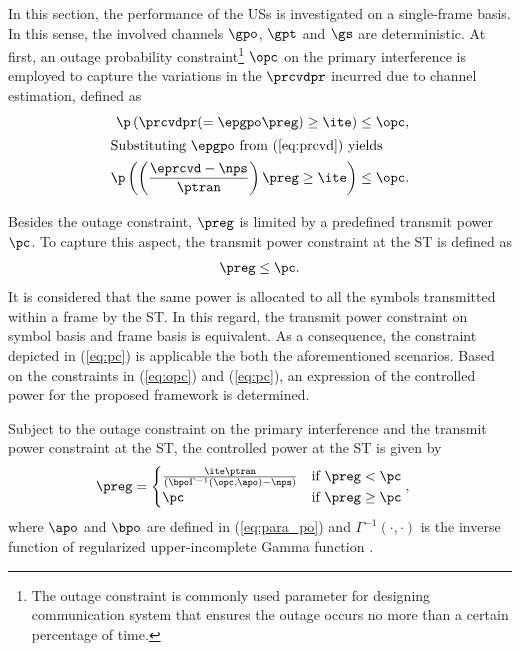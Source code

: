 In this section, the performance of the USs is investigated on a single-frame basis. In this sense, the involved channels $\gpo$, $\gpt$ and $\gs$ are deterministic.   
At first, an outage probability constraint\footnote{The outage constraint is commonly used parameter for designing communication system that ensures the outage occurs no more than a certain percentage of time.} $\opc$ on the primary interference is employed to capture the variations in the $\prcvdpr$ incurred due to channel estimation, defined as 
\begin{align}
\p\left( \prcvdpr (= \epgpo \preg) \ge \ite \right) \le \opc, \nonumber \\
\intertext{Substituting $\epgpo$ from (\ref{eq:prcvd}) yields}
\p\left( \left( \frac{\eprcvd - \nps}{\ptran}\right) \preg \ge \ite \right) \le \opc. \label{eq:opc} \\[-1em] \nonumber 
\end{align}
Besides the outage constraint, $\preg$ is limited by a predefined transmit power $\pc$. To capture this aspect, the transmit power constraint at the ST is defined as
\begin{align}
\preg \le \pc. \label{eq:pc} 
\end{align} 
It is considered that the same power is allocated to all the symbols transmitted within a frame by the ST. In this regard, the transmit power constraint on symbol basis and frame basis is equivalent. As a consequence, the constraint depicted in (\ref{eq:pc}) is applicable the both the aforementioned scenarios. Based on the constraints in (\ref{eq:opc}) and (\ref{eq:pc}), an expression of the controlled power for the proposed framework is determined.
\begin{lemma} \label{lm:lm4}
\normalfont 
Subject to the outage constraint on the primary interference and the transmit power constraint at the ST, the controlled power at the ST is given by
\begin{align}
\preg &= 
\begin{cases} 
\frac{\ite \ptran}{ \left(\bpo \Gamma^{-1}(\opc, \apo) - \nps  \right)} & \mbox{if } \preg < \pc \\
\pc & \mbox{if } \preg \ge \pc
\end{cases},
\label{eq:preg} 
\end{align}
where $\apo$ and $\bpo$ are defined in (\ref{eq:para_po}) and $\Gamma^{-1}(\cdot, \cdot)$ is the inverse function of regularized upper-incomplete Gamma function \cite{abramo}.
\end{lemma} 
